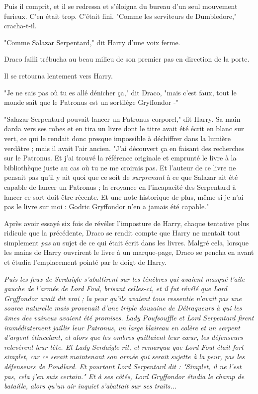 Puis il comprit, et il se redressa et s'éloigna du bureau d'un seul mouvement furieux. C'en était trop. C'était fini. "Comme les serviteurs de Dumbledore," cracha-t-il.

"Comme Salazar Serpentard," dit Harry d'une voix ferme.

Draco failli trébucha au beau milieu de son premier pas en direction de la porte.

Il se retourna lentement vers Harry.

"Je ne sais pas où tu es allé dénicher ça," dit Draco, "mais c'est faux, tout le monde sait que le Patronus est un sortilège Gryffondor -"

"Salazar Serpentard pouvait lancer un Patronus corporel," dit Harry. Sa main darda vers ses robes et en tira un livre dont le titre avait été écrit en blanc sur vert, ce qui le rendait donc presque impossible à déchiffrer dans la lumière verdâtre ; mais il avait l'air ancien. "J'ai découvert ça en faisant des recherches sur le Patronus. Et j'ai trouvé la référence originale et emprunté le livre à la bibliothèque juste au cas où tu ne me croirais pas. Et l'auteur de ce livre ne pensait pas qu'il y ait quoi que ce soit de \emph{surprenant}  à ce que Salazar ait été capable de lancer un Patronus ; la croyance en l'incapacité des Serpentard à lancer ce sort doit être récente. Et une note historique de plus, même si je n'ai pas le livre sur moi : Godric Gryffondor n'en a jamais été capable."

Après avoir essayé six fois de révéler l'imposture de Harry, chaque tentative plus ridicule que la précédente, Draco se rendit compte que Harry ne mentait tout simplement \emph{pas}  au sujet de ce qui était écrit dans les livres. Malgré cela, lorsque les mains de Harry ouvrirent le livre à un marque-page, Draco se pencha en avant et étudia l'emplacement pointé par le doigt de Harry.

\emph{Puis les feux de Serdaigle s'abattirent sur les ténèbres qui avaient masqué l'aile gauche de l'armée de Lord Foul, brisant celles-ci, et il fut révélé que Lord Gryffondor avait dit vrai ; la peur qu'ils avaient tous ressentie n'avait pas une source naturelle mais provenait d'une triple douzaine de Détraqueurs à qui les âmes des vaincus avaient été promises. Lady Poufsouffle et Lord Serpentard firent immédiatement jaillir leur Patronus, un large blaireau en colère et un serpent d'argent étincelant, et alors que les ombres quittaient leur cœur, les défenseurs relevèrent leur tête. Et Lady Serdaigle rit, et remarqua que Lord Foul était fort simplet, car ce serait maintenant son armée qui serait sujette à la peur, pas les défenseurs de Poudlard. Et pourtant Lord Serpentard dit : "Simplet, il ne l'est pas, cela j'en suis certain." Et à ses côtés, Lord Gryffondor étudia le champ de bataille, alors qu'un air inquiet s'abattait sur ses traits...} 


